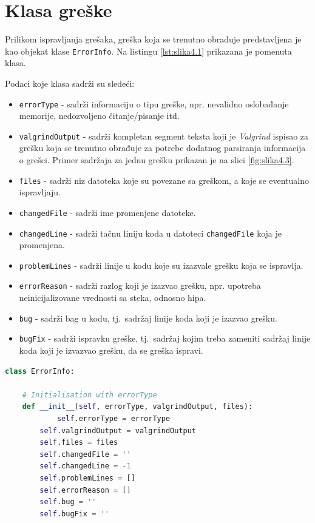\documentclass[12pt,oneside]{memoir}
\theoremstyle{plain}
\theoremstyle{definition}
\begin{document}
\section{Klasa greške}
Prilikom ispravljanja grešaka, greška koja se trenutno obrađuje predstavljena je kao objekat klase \texttt{ErrorInfo}. Na listingu \ref{lst:slika4.1} prikazana je pomenuta klasa.

Podaci koje klasa sadrži su sledeći:
\begin{itemize}
\item \texttt{errorType} - sadrži informaciju o tipu greške, npr. nevalidno oslobađanje memorije, nedozvoljeno čitanje/pisanje itd.
\item \texttt{valgrindOutput} - sadrži kompletan segment teksta koji je \textit{Valgrind} ispisao za grešku koja se trenutno obrađuje za potrebe dodatnog parsiranja informacija o grešci. Primer sadržaja za jednu grešku prikazan je na slici \ref{fig:slika4.3}.
\item \texttt{files} - sadrži niz datoteka koje su povezane sa greškom, a koje se eventualno ispravljaju.
\item \texttt{changedFile} - sadrži ime promenjene datoteke.
\item \texttt{changedLine} - sadrži tačnu liniju koda u datoteci \texttt{changedFile} koja je promenjena.
\item \texttt{problemLines} - sadrži linije u kodu koje su izazvale grešku koja se ispravlja.
\item \texttt{errorReason} - sadrži razlog koji je izazvao grešku, npr. upotreba neinicijalizovane vrednosti sa steka, odnosno hipa.
\item \texttt{bug} - sadrži bag u kodu, tj.~sadržaj linije koda koji je izazvao grešku.
\item \texttt{bugFix} - sadrži ispravku greške, tj.~sadržaj kojim treba zameniti sadržaj linije koda koji je izvazvao grešku, da se greška ispravi.
\end{itemize}

\begin{lstlisting}[style=mystyle,caption={Potpis klase \texttt{ErrorInfo}}, label={lst:slika4.1},language={Python}] 
class ErrorInfo:

	# Initialisation with errorType
	def __init__(self, errorType, valgrindOutput, files):
        	self.errorType = errorType
		self.valgrindOutput = valgrindOutput
		self.files = files
		self.changedFile = ''
		self.changedLine = -1
		self.problemLines = []
		self.errorReason = []
		self.bug = ''
		self.bugFix = ''
\end{lstlisting}
\end{document}
